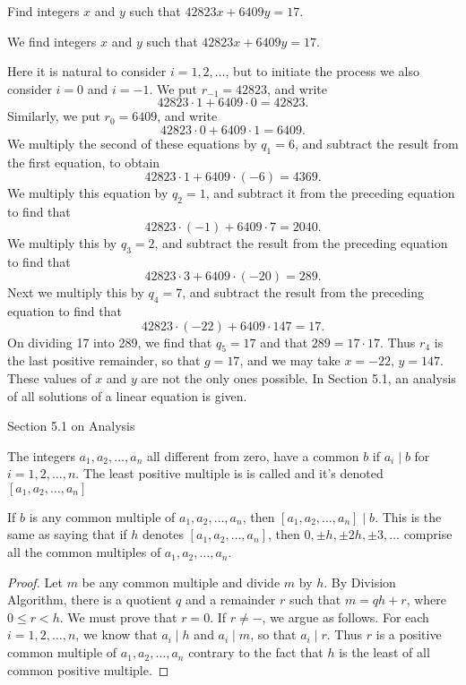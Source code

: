 \documentclass[11pt]{article}
\begin{document}
\begin{example}
	Find integers \(x\) and \(y\) such that \(42823x + 6409y = 17\).
\end{example}
\begin{solution}

	We find integers \(x\) and \(y\) such that \(42823x + 6409y = 17\).

	Here it is natural to consider \(i = 1, 2, \ldots\), but to initiate the
	process we also consider \(i = 0\) and \(i = -1\). We put \(r_{-1} = 42823\),
	and write
	\[42823 \cdot 1 + 6409 \cdot 0 = 42823.\]
	Similarly, we put \(r_0 = 6409\), and write
	\[42823 \cdot 0 + 6409 \cdot 1 = 6409.\]
	We multiply the second of these equations by \(q_1 = 6\), and subtract the
	result from the first equation, to obtain
	\[42823 \cdot 1 + 6409 \cdot (-6) = 4369.\]
	We multiply this equation by \(q_2 = 1\), and subtract it from the preceding
	equation to find that
	\[42823 \cdot (-1) + 6409 \cdot 7 = 2040.\]
	We multiply this by \(q_3 = 2\), and subtract the result from the preceding
	equation to find that
	\[42823 \cdot 3 + 6409 \cdot (-20) = 289.\]
	Next we multiply this by \(q_4 = 7\), and subtract the result from the
	preceding equation to find that
	\[42823 \cdot (-22) + 6409 \cdot 147 = 17.\]
	On dividing 17 into 289, we find that \(q_5 = 17\) and that \(289 = 17 \cdot
	17\). Thus \(r_4\) is the last positive remainder, so that \(g = 17\), and we
	may take \(x = -22\), \(y = 147\). These values of \(x\) and \(y\) are not the
	only ones possible. In Section 5.1, an analysis of all solutions of a linear
	equation is given.
\end{solution}

\begin{remark}
	Section 5.1 on Analysis
\end{remark}

\begin{definition}
	The integers \(a_1, a_2, \ldots , a_n\) all different from zero, have a common \(b\) if \(a_i \mid b\) for \(i = 1, 2, \ldots, n\). The least positive multiple is is called  and it's denoted \([a_1, a_2, \ldots, a_n]\)
\end{definition}

\begin{theorem}\label{1.12}
	If \(b\) is any common multiple of \(a_1, a_2, \ldots, a_n\), then \([a_1, a_2, \ldots, a_n] \mid b\). This is the same as saying that if \(h\) denotes \([a_1, a_2, \ldots, a_n]\), then \(0, \pm h, \pm 2h, \pm 3, \ldots\) comprise all the common multiples of \(a_1, a_2, \ldots, a_n\).
\end{theorem}
\begin{proof}
	Let \(m\) be any common multiple and divide \(m\) by \(h\). By Division Algorithm, there is a quotient \(q\) and a remainder \(r\) such that \(m = qh + r\), where \(0 \leqslant r < h\). We must prove that \(r = 0\). If \(r \neq -\), we argue as follows. For each \(i = 1, 2, \ldots, n\), we know that \(a_i \mid h\) and \(a_i \mid m\), so that \(a_i \mid r\). Thus \(r\) is a positive common multiple of \(a_1, a_2, \ldots, a_n\) contrary to the fact that \(h\) is the least of all common positive multiple.
\end{proof}
\end{document}
